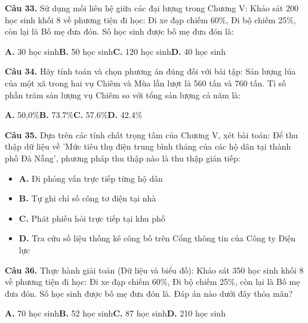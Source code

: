 \documentclass[11pt,a4paper]{article}
\begin{document}
\textbf{\color{primary} Câu 33.} Sử dụng mối liên hệ giữa các đại lượng trong Chương V: Khảo sát 200 học sinh khối 8 về phương tiện đi học: Đi xe đạp chiếm 60\%, Đi bộ chiếm 25\%, còn lại là Bố mẹ đưa đón. Số học sinh được bố mẹ đưa đón là:\par
\hspace*{1.5em}\textbf{A.} 30 học sinh\quad\quad \textbf{B.} 50 học sinh\quad\quad \textbf{C.} 120 học sinh\quad\quad \textbf{D.} 40 học sinh\par\vspace{2pt}
\textbf{\color{primary} Câu 34.} Hãy tính toán và chọn phương án đúng đối với bài tập: Sản lượng lúa của một xã trong hai vụ Chiêm và Mùa lần lượt là 560 tấn và 760 tấn. Tỉ số phần trăm sản lượng vụ Chiêm so với tổng sản lượng cả năm là:\par
\hspace*{1.5em}\textbf{A.} 50,0\%\quad\quad \textbf{B.} 73.7\%\quad\quad \textbf{C.} 57.6\%\quad\quad \textbf{D.} 42.4\%\par\vspace{2pt}
\textbf{\color{primary} Câu 35.} Dựa trên các tính chất trọng tâm của Chương V, xét bài toán: Để thu thập dữ liệu về 'Mức tiêu thụ điện trung bình tháng của các hộ dân tại thành phố Đà Nẵng', phương pháp thu thập nào là thu thập gián tiếp:\par
\begin{itemize}\setlength{\itemsep}{1pt}\setlength{\parskip}{0pt}
  \item[] \textbf{A.} Đi phỏng vấn trực tiếp từng hộ dân
  \item[] \textbf{B.} Tự ghi chỉ số công tơ điện tại nhà
  \item[] \textbf{C.} Phát phiếu hỏi trực tiếp tại khu phố
  \item[] \textbf{D.} Tra cứu số liệu thống kê công bố trên Cổng thông tin của Công ty Điện lực
\end{itemize}\vspace{2pt}
\textbf{\color{primary} Câu 36.} Thực hành giải toán (Dữ liệu và biểu đồ): Khảo sát 350 học sinh khối 8 về phương tiện đi học: Đi xe đạp chiếm 60\%, Đi bộ chiếm 25\%, còn lại là Bố mẹ đưa đón. Số học sinh được bố mẹ đưa đón là. Đáp án nào dưới đây thỏa mãn?\par
\hspace*{1.5em}\textbf{A.} 70 học sinh\quad\quad \textbf{B.} 52 học sinh\quad\quad \textbf{C.} 87 học sinh\quad\quad \textbf{D.} 210 học sinh\par\vspace{2pt}
\end{document}
